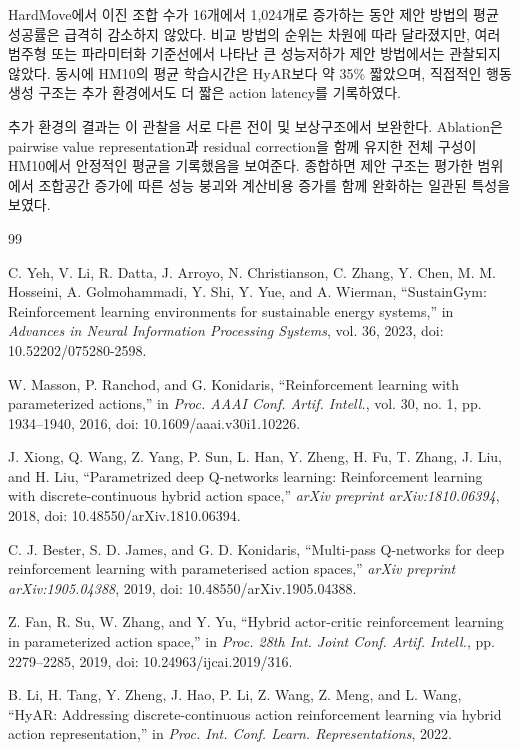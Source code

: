 \documentclass[10pt,journal]{IEEEtran}
\begin{document}
HardMove에서 이진 조합 수가 16개에서 1,024개로 증가하는 동안 제안 방법의 평균 성공률은 급격히 감소하지 않았다. 비교 방법의 순위는 차원에 따라 달라졌지만, 여러 범주형 또는 파라미터화 기준선에서 나타난 큰 성능저하가 제안 방법에서는 관찰되지 않았다. 동시에 HM10의 평균 학습시간은 HyAR보다 약 35\% 짧았으며, 직접적인 행동생성 구조는 추가 환경에서도 더 짧은 action latency를 기록하였다.

추가 환경의 결과는 이 관찰을 서로 다른 전이 및 보상구조에서 보완한다. Ablation은 pairwise value representation과 residual correction을 함께 유지한 전체 구성이 HM10에서 안정적인 평균을 기록했음을 보여준다. 종합하면 제안 구조는 평가한 범위에서 조합공간 증가에 따른 성능 붕괴와 계산비용 증가를 함께 완화하는 일관된 특성을 보였다.


\begin{thebibliography}{99}

C. Yeh, V. Li, R. Datta, J. Arroyo, N. Christianson,
C. Zhang, Y. Chen, M. M. Hosseini, A. Golmohammadi,
Y. Shi, Y. Yue, and A. Wierman,
``SustainGym: Reinforcement learning environments
for sustainable energy systems,''
in \emph{Advances in Neural Information Processing Systems},
vol. 36, 2023,
doi: 10.52202/075280-2598.

W. Masson, P. Ranchod, and G. Konidaris,
``Reinforcement learning with parameterized actions,''
in \emph{Proc. AAAI Conf. Artif. Intell.},
vol. 30, no. 1, pp. 1934--1940, 2016,
doi: 10.1609/aaai.v30i1.10226.

J. Xiong, Q. Wang, Z. Yang, P. Sun, L. Han, Y. Zheng,
H. Fu, T. Zhang, J. Liu, and H. Liu,
``Parametrized deep Q-networks learning:
Reinforcement learning with discrete-continuous hybrid action space,''
\emph{arXiv preprint arXiv:1810.06394}, 2018,
doi: 10.48550/arXiv.1810.06394.

C. J. Bester, S. D. James, and G. D. Konidaris,
``Multi-pass Q-networks for deep reinforcement learning
with parameterised action spaces,''
\emph{arXiv preprint arXiv:1905.04388}, 2019,
doi: 10.48550/arXiv.1905.04388.

Z. Fan, R. Su, W. Zhang, and Y. Yu,
``Hybrid actor-critic reinforcement learning
in parameterized action space,''
in \emph{Proc. 28th Int. Joint Conf. Artif. Intell.},
pp. 2279--2285, 2019,
doi: 10.24963/ijcai.2019/316.

B. Li, H. Tang, Y. Zheng, J. Hao, P. Li, Z. Wang,
Z. Meng, and L. Wang,
``HyAR: Addressing discrete-continuous action reinforcement
learning via hybrid action representation,''
in \emph{Proc. Int. Conf. Learn. Representations}, 2022.


\end{thebibliography}
\end{document}
